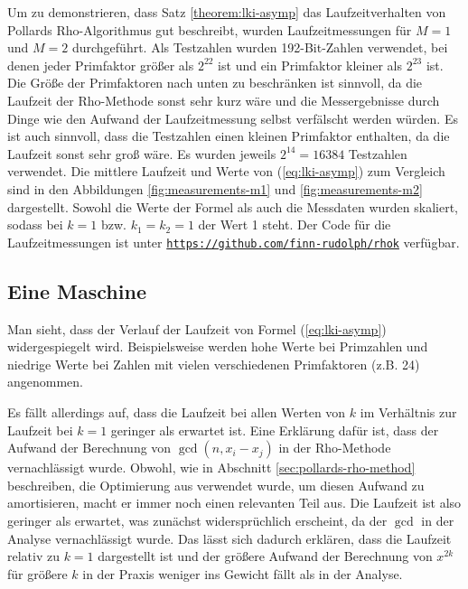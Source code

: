\documentclass[a4paper, 11pt, ngerman]{article}
\theoremstyle{definition}
\theoremstyle{plain}
\theoremstyle{remark}
\begin{document}
Um zu demonstrieren, dass Satz \ref{theorem:lki-asymp} das Laufzeitverhalten von Pollards Rho-Algorithmus gut beschreibt, wurden Laufzeitmessungen für $M = 1$ und $M = 2$ durchgeführt. Als Testzahlen wurden 192-Bit-Zahlen verwendet, bei denen jeder Primfaktor größer als $2^{22}$ ist und ein Primfaktor kleiner als $2^{23}$ ist. Die Größe der Primfaktoren nach unten zu beschränken ist sinnvoll, da die Laufzeit der Rho-Methode sonst sehr kurz wäre und die Messergebnisse durch Dinge wie den Aufwand der Laufzeitmessung selbst verfälscht werden würden. Es ist auch sinnvoll, dass die Testzahlen einen kleinen Primfaktor enthalten, da die Laufzeit sonst sehr groß wäre. Es wurden jeweils $2^{14} = 16384$ Testzahlen verwendet. Die mittlere Laufzeit und Werte von (\ref{eq:lki-asymp}) zum Vergleich sind in den Abbildungen \ref{fig:measurements-m1} und \ref{fig:measurements-m2} dargestellt. Sowohl die Werte der Formel als auch die Messdaten wurden skaliert, sodass bei $k = 1$ bzw. $k_1 = k_2 = 1$ der Wert 1 steht. Der Code für die Laufzeitmessungen ist unter \href{https://github.com/finn-rudolph/rhok}{\texttt{https://github.com/finn-rudolph/rhok}} verfügbar.

\subsection{Eine Maschine}

Man sieht, dass der Verlauf der Laufzeit von Formel (\ref{eq:lki-asymp}) widergespiegelt wird. Beispielsweise werden hohe Werte bei Primzahlen und niedrige Werte bei Zahlen mit vielen verschiedenen Primfaktoren (z.B. 24) angenommen.

Es fällt allerdings auf, dass die Laufzeit bei allen Werten von $k$ im Verhältnis zur Laufzeit bei $k = 1$ geringer als erwartet ist. Eine Erklärung dafür ist, dass der Aufwand der Berechnung von $\gcd(n, x_i - x_j)$ in der Rho-Methode vernachlässigt wurde. Obwohl, wie in Abschnitt \ref{sec:pollards-rho-method} beschreiben, die Optimierung aus \cite{bre80} verwendet wurde, um diesen Aufwand zu amortisieren, macht er immer noch einen relevanten Teil aus. Die Laufzeit ist also geringer als erwartet, was zunächst widersprüchlich erscheint, da der $\gcd$ in der Analyse vernachlässigt wurde. Das lässt sich dadurch erklären, dass die Laufzeit relativ zu $k = 1$ dargestellt ist und der größere Aufwand der Berechnung von $x^{2k}$ für größere $k$ in der Praxis weniger ins Gewicht fällt als in der Analyse.
\end{document}
